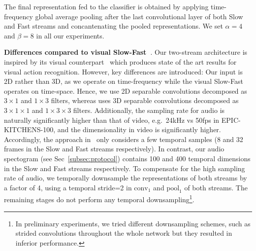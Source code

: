 \documentclass{article}
\begin{document}
The final representation fed to the classifier is obtained by applying time-frequency global average pooling after the last convolutional layer of both Slow and Fast streams and concantenating the pooled representations. We set $\alpha=4$ and $\beta=8$ in all our experiments.

\noindent\textbf{Differences compared to visual Slow-Fast~\cite{Feichtenhofer_2019_ICCV}}.
Our two-stream architecture is inspired by its visual counterpart~\cite{Feichtenhofer_2019_ICCV} which produces state of the art results for visual action recognition. 
However, key differences are introduced:
Our input is 2D rather than 3D, as we operate on time-frequency while the visual Slow-Fast operates on time-space. Hence, we use 2D separable convolutions decomposed as $3\times1$ and $1\times3$ filters, whereas \cite{Feichtenhofer_2019_ICCV} uses 3D separable convolutions decomposed as $3\times1\times1$ and $1\times3\times3$ filters.
Additionally, the sampling rate for audio is  naturally significantly higher than that of video, e.g.\ 24kHz vs 50fps in EPIC-KITCHENS-100, and the dimensionality in video is significantly higher. Accordingly, the approach in~\cite{Feichtenhofer_2019_ICCV} only considers a few temporal samples (8 and 32 frames in the Slow and Fast streams respectively). In contrast, our audio spectogram (see Sec~\ref{subsec:protocol}) contains 100 and 400 temporal dimensions in the Slow and Fast streams respectively. To compensate for the high sampling rate of audio, we temporally downsample the representations of both streams by a factor of 4, using a temporal stride=2 in $\text{conv}_{\text{1}}$ and $\text{pool}_{\text{1}}$ of both streams. The remaining stages do not perform any temporal downsampling\footnote{In preliminary experiments, we tried different downsampling schemes, such as strided convolutions throughout the whole network but they resulted in inferior performance.}.
\end{document}
